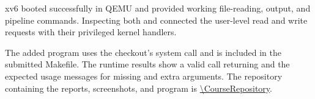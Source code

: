 \documentclass{../latex/utmreport}
\begin{document}
\utmconclusions
xv6 booted successfully in QEMU and provided working file-reading, output,
and pipeline commands. Inspecting both  and
 connected the user-level read and write requests
with their privileged kernel handlers.

The added  program uses the checkout's  system
call and is included in the submitted Makefile. The runtime
results show a valid call returning and the expected usage messages for
missing and extra arguments. The repository containing the reports,
screenshots, and program is \expandafter\url\expandafter{\CourseRepository}.
\end{document}
